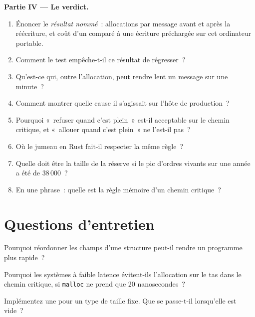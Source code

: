 \begin{problem}
\medskip\noindent\textbf{Partie IV --- Le verdict.}
\begin{enumerate}[resume]
\item Énoncer le \emph{résultat nommé}~: allocations par message avant et après la réécriture, et coût d'un 
comparé à une écriture préchargée sur cet ordinateur portable.
\item Comment le test empêche-t-il ce résultat de régresser~?
\item Qu'est-ce qui, outre l'allocation, peut rendre lent un message sur une minute~?
\item Comment montrer quelle cause il s'agissait sur l'hôte de production~?
\item Pourquoi «~refuser quand c'est plein~» est-il acceptable sur le chemin critique, et «~allouer quand c'est plein~» ne l'est-il pas~?
\item Où le jumeau en Rust fait-il respecter la même règle~?
\item Quelle doit être la taille de la réserve si le pic d'ordres vivants sur une année a été de 38\,000~?
\item En une phrase~: quelle est la règle mémoire d'un chemin critique~?
\end{enumerate}
\end{problem}

\section{Questions d'entretien}

\begin{interviewq}\label{iq:ll:cpp-for-latency-i-memory:1}
Pourquoi réordonner les champs d'une structure peut-il rendre un programme plus rapide~?
\end{interviewq}

\begin{interviewq}\label{iq:ll:cpp-for-latency-i-memory:2}
Pourquoi les systèmes à faible latence évitent-ils l'allocation sur le tas dans le chemin critique, si \texttt{malloc} ne prend que 20 nanosecondes~?
\end{interviewq}

\begin{interviewq}\label{iq:ll:cpp-for-latency-i-memory:3}
Implémentez une  pour un type de taille fixe. Que se passe-t-il lorsqu'elle est vide~?
\end{interviewq}

